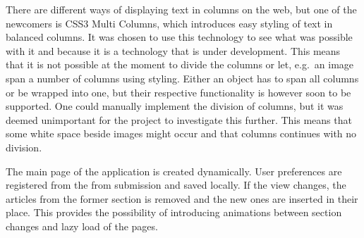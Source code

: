 There are different ways of displaying text in columns on the web, but one of the newcomers is CSS3 Multi Columns, which introduces easy styling of text in balanced columns. It was chosen to use this technology to see what was possible with it and because it is a technology that is under development. This means that it is not possible at the moment to divide the columns or let, e.g.\ an image span a number of columns using styling. Either an object has to span all columns or be wrapped into one, but their respective functionality is however soon to be supported. One could manually implement the division of columns, but it was deemed unimportant for the project to investigate this further. This means that some white space beside images might occur and that columns continues with no division.

The main page of the application is created dynamically. User preferences are registered from the from submission and saved locally. If the view changes, the articles from the former section is removed and the new ones are inserted in their place. This provides the possibility of introducing animations between section changes and lazy load of the pages.

